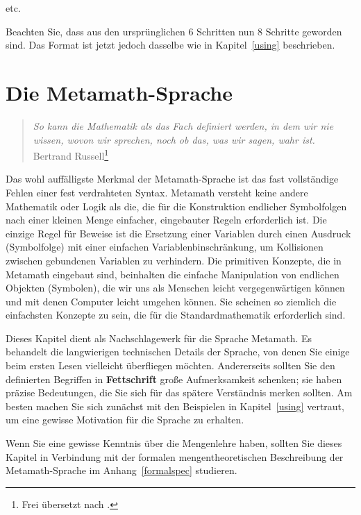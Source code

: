 \begin{center}
{etc.}
\end{center}

Beachten Sie, dass aus den ursprünglichen 6 Schritten nun 8 Schritte geworden sind.  Das Format ist jetzt jedoch dasselbe wie in Kapitel~\ref{using} beschrieben.

\chapter{Die Metamath-Sprache}
\label{languagespec}

\begin{quote}
  {\em So kann die Mathematik als das Fach definiert werden, in dem wir nie wissen, wovon wir sprechen, noch ob das, was wir sagen, wahr ist.}
      \flushright\sc  Bertrand Russell\footnote{Frei übersetzt nach \cite[S.~84]{Russell2}.}\\
\end{quote}

Das wohl auffälligste Merkmal der Metamath-Sprache ist das fast voll\-stän\-dige Fehlen einer fest verdrahteten Syntax. Metamath versteht keine andere Mathematik oder Logik als die, die für die Konstruktion endlicher Symbolfolgen nach einer kleinen Menge einfacher, eingebauter Regeln erforderlich ist.  Die einzige Regel für Beweise ist die Ersetzung einer Variablen durch einen Ausdruck (Symbolfolge) mit einer einfachen Variablenbinschränkung, um Kollisionen zwischen gebundenen Variablen zu verhindern.  Die primitiven Konzepte, die in Metamath eingebaut sind, beinhalten die einfache Manipulation von endlichen Objekten (Symbolen), die wir uns als Menschen leicht vergegenwärtigen können und mit denen Computer leicht umgehen können.  Sie scheinen so ziemlich die einfachsten Konzepte zu sein, die für die Standardmathematik erforderlich sind.

Dieses Kapitel dient als Nachschlagewerk für die Sprache Metamath. Es behandelt die langwierigen technischen Details der Sprache, von denen Sie einige beim ersten Lesen vielleicht überfliegen möchten.  Andererseits sollten Sie den definierten Begriffen in {\bf Fettschrift} große Aufmerksamkeit schenken; sie haben präzise Bedeutungen, die Sie sich für das spätere Verständnis merken sollten.  Am besten machen Sie sich zunächst mit den Beispielen in Kapitel~\ref{using} vertraut, um eine gewisse Motivation für die Sprache zu erhalten.

Wenn Sie eine gewisse Kenntnis über die Mengenlehre haben, sollten Sie dieses Kapitel in Verbindung mit der formalen mengentheoretischen Beschreibung der Metamath-Sprache im Anhang~\ref{formalspec} studieren.

